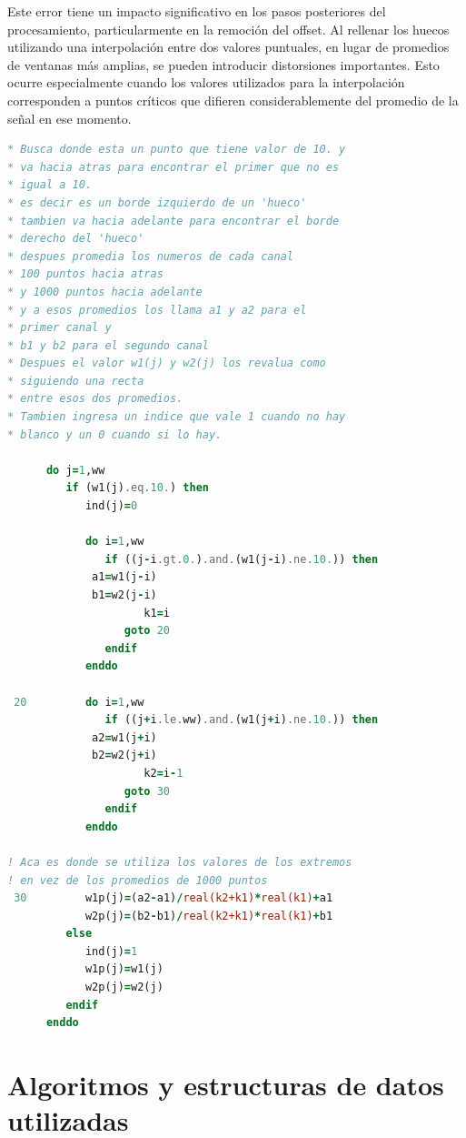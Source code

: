 \documentclass[12pt,a4paper]{article}
\begin{document}
Este error tiene un impacto significativo en los pasos posteriores del procesamiento, particularmente en la remoción del offset. Al rellenar los huecos utilizando una interpolación entre dos valores puntuales, en lugar de promedios de ventanas más amplias, se pueden introducir distorsiones importantes. Esto ocurre especialmente cuando los valores utilizados para la interpolación corresponden a puntos críticos que difieren considerablemente del promedio de la señal en ese momento.

\begin{lstlisting}[language=Fortran, label=lst:codigo_error, caption={promedio\_general.f - Error en implementación de rellenado de huecos}]
* Busca donde esta un punto que tiene valor de 10. y 
* va hacia atras para encontrar el primer que no es
* igual a 10.
* es decir es un borde izquierdo de un 'hueco'
* tambien va hacia adelante para encontrar el borde
* derecho del 'hueco'
* despues promedia los numeros de cada canal
* 100 puntos hacia atras
* y 1000 puntos hacia adelante 
* y a esos promedios los llama a1 y a2 para el 
* primer canal y
* b1 y b2 para el segundo canal
* Despues el valor w1(j) y w2(j) los revalua como
* siguiendo una recta 
* entre esos dos promedios.
* Tambien ingresa un indice que vale 1 cuando no hay
* blanco y un 0 cuando si lo hay.

      do j=1,ww
         if (w1(j).eq.10.) then
            ind(j)=0
            
            do i=1,ww
               if ((j-i.gt.0.).and.(w1(j-i).ne.10.)) then
		     a1=w1(j-i)
		     b1=w2(j-i)                  
                     k1=i
                  goto 20
               endif
            enddo
            
 20         do i=1,ww  
               if ((j+i.le.ww).and.(w1(j+i).ne.10.)) then
		     a2=w1(j+i)
		     b2=w2(j+i)                  
                     k2=i-1
                  goto 30
               endif
            enddo

! Aca es donde se utiliza los valores de los extremos
! en vez de los promedios de 1000 puntos
 30         w1p(j)=(a2-a1)/real(k2+k1)*real(k1)+a1
            w2p(j)=(b2-b1)/real(k2+k1)*real(k1)+b1
         else
            ind(j)=1
            w1p(j)=w1(j)
            w2p(j)=w2(j)
         endif
      enddo
\end{lstlisting}

\section{Algoritmos y estructuras de datos utilizadas}
\lhead{}
\end{document}
